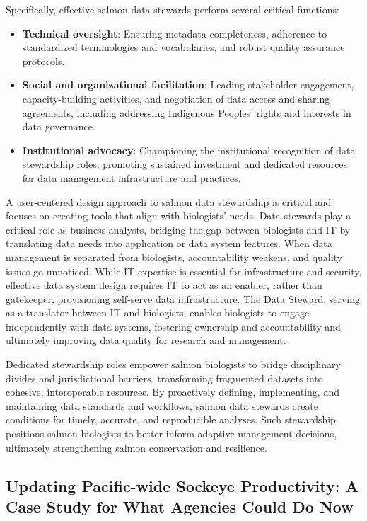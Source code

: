 \documentclass[
  letterpaper,
  DIV=11,
  numbers=noendperiod]{scrartcl}
\begin{document}
Specifically, effective salmon data stewards perform several critical
functions:

\begin{itemize}
\item
  \textbf{Technical oversight}: Ensuring metadata completeness,
  adherence to standardized terminologies and vocabularies, and robust
  quality assurance protocols.
\item
  \textbf{Social and organizational facilitation}: Leading stakeholder
  engagement, capacity-building activities, and negotiation of data
  access and sharing agreements, including addressing Indigenous
  Peoples' rights and interests in data governance.
\item
  \textbf{Institutional advocacy}: Championing the institutional
  recognition of data stewardship roles, promoting sustained investment
  and dedicated resources for data management infrastructure and
  practices.
\end{itemize}

A user-centered design approach to salmon data stewardship is critical
and focuses on creating tools that align with biologists' needs. Data
stewards play a critical role as business analysts, bridging the gap
between biologists and IT by translating data needs into application or
data system features. When data management is separated from biologists,
accountability weakens, and quality issues go unnoticed. While IT
expertise is essential for infrastructure and security, effective data
system design requires IT to act as an enabler, rather than gatekeeper,
provisioning self-serve data infrastructure. The Data Steward, serving
as a translator between IT and biologists, enables biologists to engage
independently with data systems, fostering ownership and accountability
and ultimately improving data quality for research and management.

Dedicated stewardship roles empower salmon biologists to bridge
disciplinary divides and jurisdictional barriers, transforming
fragmented datasets into cohesive, interoperable resources. By
proactively defining, implementing, and maintaining data standards and
workflows, salmon data stewards create conditions for timely, accurate,
and reproducible analyses. Such stewardship positions salmon biologists
to better inform adaptive management decisions, ultimately strengthening
salmon conservation and resilience.

\subsection{Updating Pacific-wide Sockeye Productivity: A Case Study for
What Agencies Could Do
Now}\label{updating-pacific-wide-sockeye-productivity-a-case-study-for-what-agencies-could-do-now}
\end{document}

